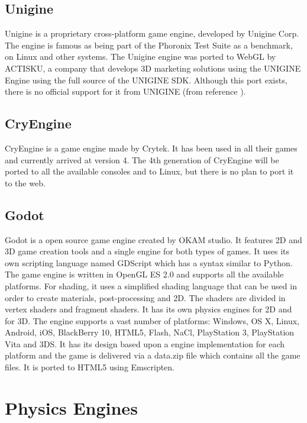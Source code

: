 \subsection{Unigine}

Unigine is a proprietary cross-platform game engine, developed by Unigine Corp. The engine is famous as being part of the Phoronix Test Suite as a benchmark, on Linux and other systems. 
The Unigine engine was ported to WebGL by ACTISKU, a company that develops 3D marketing solutions using the UNIGINE Engine using the full source of the UNIGINE SDK. Although this port exists, there is no official support for it from UNIGINE (from reference \cite{unigine13}).

\subsection{CryEngine}

CryEngine is a game engine made by Crytek. It has been used in all their games and currently arrived at version 4. The 4th generation of CryEngine will be ported to all the available consoles and to Linux, but there is no plan to port it to the web.

\subsection{Godot}

Godot is a open source game engine created by OKAM studio. It features 2D and 3D game creation tools and a single engine for both types of games. It uses its own scripting language named GDScript which has a syntax similar to Python. The game engine is written in OpenGL ES 2.0 and supports all the available platforms. For shading, it uses a simplified shading language that can be used in order to create materials, post-processing and 2D. The shaders are divided in vertex shaders and fragment shaders. It has its own physics engines for 2D and for 3D. The engine supports a vast number of platforms:  Windows, OS X, Linux, Android, iOS, BlackBerry 10, HTML5, Flash, NaCl, PlayStation 3, PlayStation Vita and 3DS. It has its design based upon a engine implementation for each platform and the game is delivered via a data.zip file which contains all the game files. It is ported to HTML5 using Emscripten.

\section{Physics Engines}

